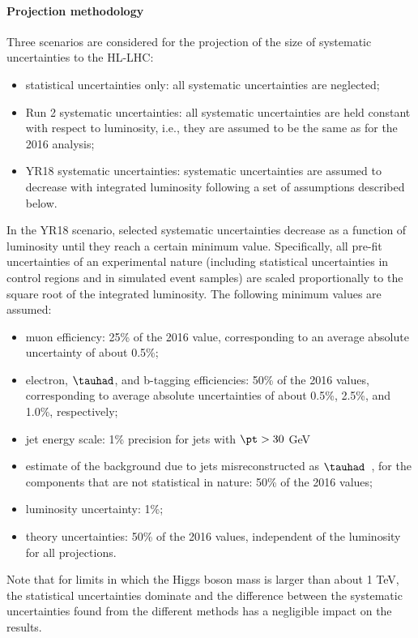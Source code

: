 \paragraph{Projection methodology}
\label{sec:method}
%
Three scenarios are considered for the projection of the size of
systematic uncertainties to the HL-LHC:
\begin{itemize}
\item
statistical uncertainties only: all systematic uncertainties are neglected;
\item
  Run 2 systematic uncertainties: all systematic uncertainties are held
  constant with respect to luminosity, i.e., they are assumed to be
  the same as for the 2016 analysis;
\item
  YR18 systematic uncertainties: systematic uncertainties are assumed to
  decrease with integrated luminosity
  following a set of assumptions described below.
\end{itemize}

In the YR18 scenario,
selected systematic uncertainties decrease
as a function of luminosity until they reach a certain minimum value. 
Specifically, all pre-fit uncertainties of an experimental nature
(including statistical uncertainties in control regions and
in simulated event samples) 
are scaled proportionally to the square root of the integrated luminosity.
The following minimum values are assumed:
\begin{itemize}
\item
muon efficiency: 25\% of the 2016 value, corresponding to an average absolute uncertainty of about 0.5\%; 
\item
electron, $\tauhad$, and b-tagging efficiencies: 50\% of the 2016 values, 
corresponding to average absolute uncertainties
of about 0.5\%, 2.5\%, and 1.0\%, respectively;
\item
jet energy scale: 1\% precision for jets with $\pt > 30$ GeV%
\item
  estimate of the background due to jets misreconstructed
  as $\tauhad$~\cite{HIG-15-007},
  for the components that are not statistical in nature:
  50\% of the 2016 values;
\item
luminosity uncertainty: 1\%;
\item
  theory uncertainties: 50\% of the 2016 values,
  independent of the luminosity for all projections.
\end{itemize}
Note that for limits in which the Higgs boson mass is larger than about 1 TeV,
the statistical uncertainties dominate and
the difference between the systematic uncertainties found from
the different methods has a negligible impact on the results.

